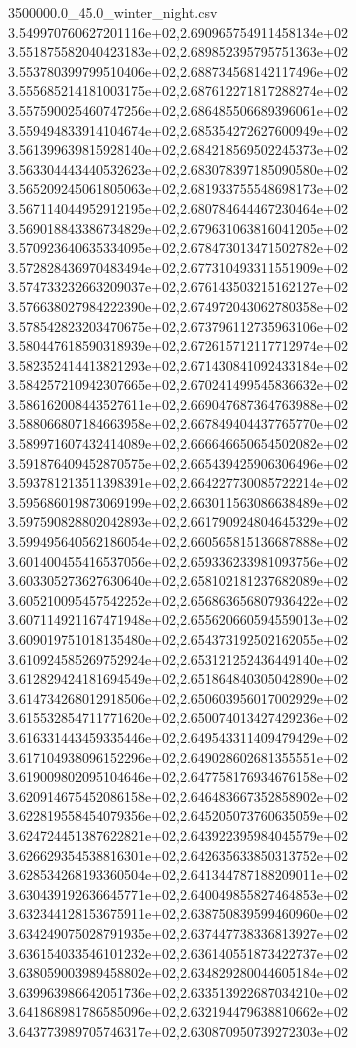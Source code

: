 \begin{filecontents*}{3500000.0_45.0_winter_night.csv}
3.549970760627201116e+02,2.690965754911458134e+02
3.551875582040423183e+02,2.689852395795751363e+02
3.553780399799510406e+02,2.688734568142117496e+02
3.555685214181003175e+02,2.687612271817288274e+02
3.557590025460747256e+02,2.686485506689396061e+02
3.559494833914104674e+02,2.685354272627600949e+02
3.561399639815928140e+02,2.684218569502245373e+02
3.563304443440532623e+02,2.683078397185090580e+02
3.565209245061805063e+02,2.681933755548698173e+02
3.567114044952912195e+02,2.680784644467230464e+02
3.569018843386734829e+02,2.679631063816041205e+02
3.570923640635334095e+02,2.678473013471502782e+02
3.572828436970483494e+02,2.677310493311551909e+02
3.574733232663209037e+02,2.676143503215162127e+02
3.576638027984222390e+02,2.674972043062780358e+02
3.578542823203470675e+02,2.673796112735963106e+02
3.580447618590318939e+02,2.672615712117712974e+02
3.582352414413821293e+02,2.671430841092433184e+02
3.584257210942307665e+02,2.670241499545836632e+02
3.586162008443527611e+02,2.669047687364763988e+02
3.588066807184663958e+02,2.667849404437765770e+02
3.589971607432414089e+02,2.666646650654502082e+02
3.591876409452870575e+02,2.665439425906306496e+02
3.593781213511398391e+02,2.664227730085722214e+02
3.595686019873069199e+02,2.663011563086638489e+02
3.597590828802042893e+02,2.661790924804645329e+02
3.599495640562186054e+02,2.660565815136687888e+02
3.601400455416537056e+02,2.659336233981093756e+02
3.603305273627630640e+02,2.658102181237682089e+02
3.605210095457542252e+02,2.656863656807936422e+02
3.607114921167471948e+02,2.655620660594559013e+02
3.609019751018135480e+02,2.654373192502162055e+02
3.610924585269752924e+02,2.653121252436449140e+02
3.612829424181694549e+02,2.651864840305042890e+02
3.614734268012918506e+02,2.650603956017002929e+02
3.615532854711771620e+02,2.650074013427429236e+02
3.616331443459335446e+02,2.649543311409479429e+02
3.617104938096152296e+02,2.649028602681355551e+02
3.619009802095104646e+02,2.647758176934676158e+02
3.620914675452086158e+02,2.646483667352858902e+02
3.622819558454079356e+02,2.645205073760635059e+02
3.624724451387622821e+02,2.643922395984045579e+02
3.626629354538816301e+02,2.642635633850313752e+02
3.628534268193360504e+02,2.641344787188209011e+02
3.630439192636645771e+02,2.640049855827464853e+02
3.632344128153675911e+02,2.638750839599460960e+02
3.634249075028791935e+02,2.637447738336813927e+02
3.636154033546101232e+02,2.636140551873422737e+02
3.638059003989458802e+02,2.634829280044605184e+02
3.639963986642051736e+02,2.633513922687034210e+02
3.641868981786585096e+02,2.632194479638810662e+02
3.643773989705746317e+02,2.630870950739272303e+02

\end{filecontents*}
